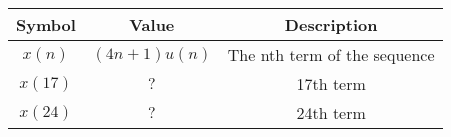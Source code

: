 
    \begin{tabular}{|c|c|c|}
    \hline
     \textbf{Symbol} & \textbf{Value} &
     \textbf{Description}\\
    \hline
     $x(n)$ &  $(4n+1)u(n)$ & The nth term of the sequence\\[6pt]
    \hline 
     $x(17)$ &  $?$ & 17th term \\[6pt]
    \hline
     $x(24)$ &  $?$ & 24th term\\[6pt]
    \hline
     
\end{tabular}
